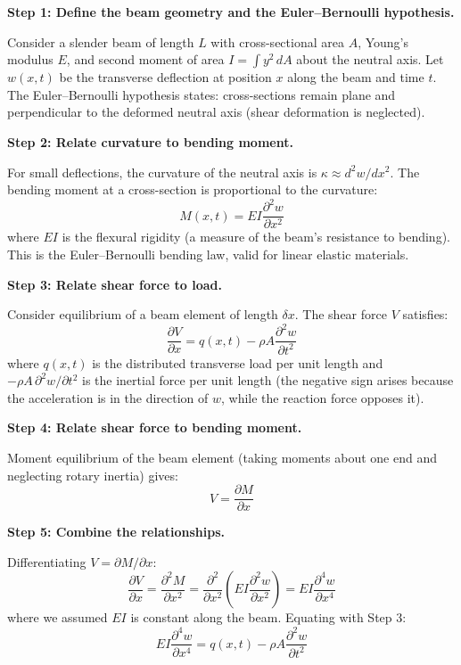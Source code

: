\textbf{Step 1: Define the beam geometry and the Euler--Bernoulli hypothesis.}

Consider a slender beam of length $L$ with cross-sectional area $A$, Young's modulus $E$, and second moment of area $I = \int y^2\,dA$ about the neutral axis. Let $w(x,t)$ be the transverse deflection at position $x$ along the beam and time $t$. The Euler--Bernoulli hypothesis states: cross-sections remain plane and perpendicular to the deformed neutral axis (shear deformation is neglected).

\textbf{Step 2: Relate curvature to bending moment.}

For small deflections, the curvature of the neutral axis is $\kappa \approx d^2w/dx^2$. The bending moment at a cross-section is proportional to the curvature:
\begin{equation}
M(x,t) = EI\frac{\partial^2 w}{\partial x^2}
\end{equation}
where $EI$ is the flexural rigidity (a measure of the beam's resistance to bending). This is the Euler--Bernoulli bending law, valid for linear elastic materials.

\textbf{Step 3: Relate shear force to load.}

Consider equilibrium of a beam element of length $\delta x$. The shear force $V$ satisfies:
\begin{equation}
\frac{\partial V}{\partial x} = q(x,t) - \rho A\frac{\partial^2 w}{\partial t^2}
\end{equation}
where $q(x,t)$ is the distributed transverse load per unit length and $-\rho A\,\partial^2 w/\partial t^2$ is the inertial force per unit length (the negative sign arises because the acceleration is in the direction of $w$, while the reaction force opposes it).

\textbf{Step 4: Relate shear force to bending moment.}

Moment equilibrium of the beam element (taking moments about one end and neglecting rotary inertia) gives:
\begin{equation}
V = \frac{\partial M}{\partial x}
\end{equation}

\textbf{Step 5: Combine the relationships.}

Differentiating $V = \partial M/\partial x$:
\begin{equation}
\frac{\partial V}{\partial x} = \frac{\partial^2 M}{\partial x^2} = \frac{\partial^2}{\partial x^2}\left(EI\frac{\partial^2 w}{\partial x^2}\right) = EI\frac{\partial^4 w}{\partial x^4}
\end{equation}
where we assumed $EI$ is constant along the beam. Equating with Step 3:
\begin{equation}
EI\frac{\partial^4 w}{\partial x^4} = q(x,t) - \rho A\frac{\partial^2 w}{\partial t^2}
\end{equation}

